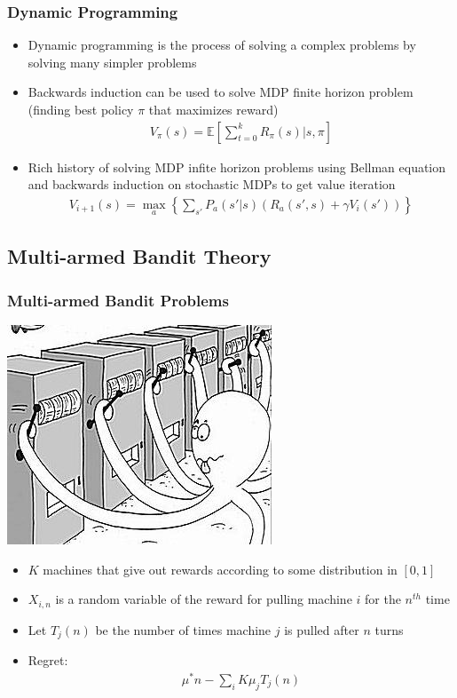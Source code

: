 \documentclass{beamer}
\begin{document}


\begin{frame}
  \frametitle{Dynamic Programming}

  \begin{itemize}
    \item Dynamic programming is the process of solving a complex problems by solving many simpler problems
    \item Backwards induction can be used to solve MDP finite horizon problem (finding best policy $\pi$ that maximizes reward)
      \begin{gather*}
        V_\pi(s) = \mathbb{E}[\sum_{t=0}^k R_\pi(s) | s, \pi]
      \end{gather*}
    \item Rich history of solving MDP infite horizon problems using Bellman equation and backwards induction on stochastic MDPs to get value iteration
      \begin{gather*}
        V_{i+1}(s) = \max_a \left\{ \sum_{s'} P_a(s' | s)(R_a(s',s)+\gamma V_i(s'))  \right\}
      \end{gather*}
  \end{itemize}
\end{frame}


\subsection{Multi-armed Bandit Theory}

\begin{frame}
  \frametitle{Multi-armed Bandit Problems}

  \begin{center}
    \includegraphics[width=0.3\linewidth]{./images/bandit.png}
  \end{center}

  \begin{itemize}
    \item $K$ machines that give out rewards according to some distribution in $[0,1]$
    \item $X_{i,n}$ is a random variable of the reward for pulling machine $i$ for the $n^{th}$ time
    \item Let $T_j(n)$ be the number of times machine $j$ is pulled after $n$ turns
    \item Regret:
      \begin{gather*}
        \mu^* n - \sum_i{K} \mu_j T_j(n)
      \end{gather*}
  \end{itemize}
\end{frame}
\end{document}
